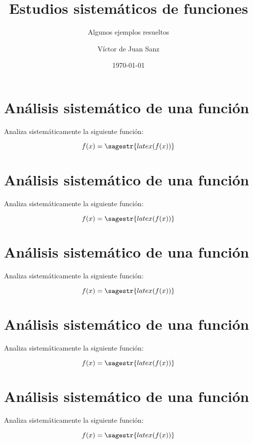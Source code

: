 \documentclass[nochap,palatino,nobuilddate]{estudioFuncion}
\title{Estudios sistemáticos de funciones}
\author{Víctor de Juan Sanz}
\date{\today}
\subtitle{Algunos ejemplos resueltos}
\newif\ifbreve
\newcommand{\newexample}[1]{
	\section{Análisis sistemático de una función}
	Analiza sistemáticamente la siguiente función:
	
	\begin{mdframed}
	\[f(x) = \sagestr{latex(f(x))}\]
	\end{mdframed}
	\ifbreve
		
	\else
		
	\fi
	\newpage
}
\begin{document}
\maketitle


\newexample{tex/function}
\newexample{tex/function2}
\newexample{tex/function3}
\newexample{tex/function4}
\newexample{tex/function5}
\end{document}
